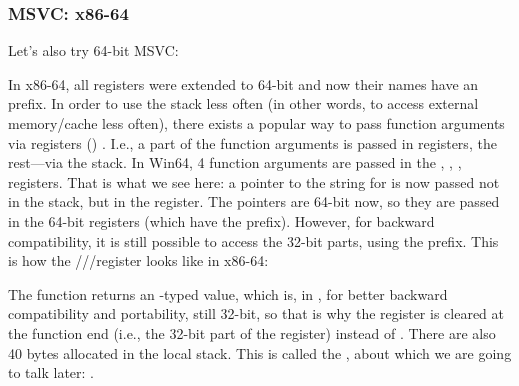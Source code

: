\subsubsection{MSVC: x86-64}

Let's also try 64-bit MSVC:




In x86-64, all registers were extended to 64-bit and now their names have an  prefix.
In order to use the stack less often (in other words, to access external memory/cache less often), there exists
a popular way to pass function arguments via registers () .
I.e., a part of the function arguments is passed in registers, the rest---via the stack.
In Win64, 4 function arguments are passed in the \RCX, \RDX, ,  registers.
That is what we see here: a pointer to the string for \printf is now passed not in the stack, but in the \RCX register.
The pointers are 64-bit now, so they are passed in the 64-bit registers (which have the  prefix).
However, for backward compatibility, it is still possible to access the 32-bit parts, using the  prefix.
This is how the \RAX/\EAX/\AX/\AL register looks like in x86-64:


The \main function returns an \Tint{}-typed value, which is, in \CCpp, for better backward compatibility
and portability, still 32-bit, so that is why the \EAX register is cleared at the function end (i.e., the 32-bit
part of the register) instead of \RAX{}.
There are also 40 bytes allocated in the local stack.
This is called the , about which we are going to talk later: .
